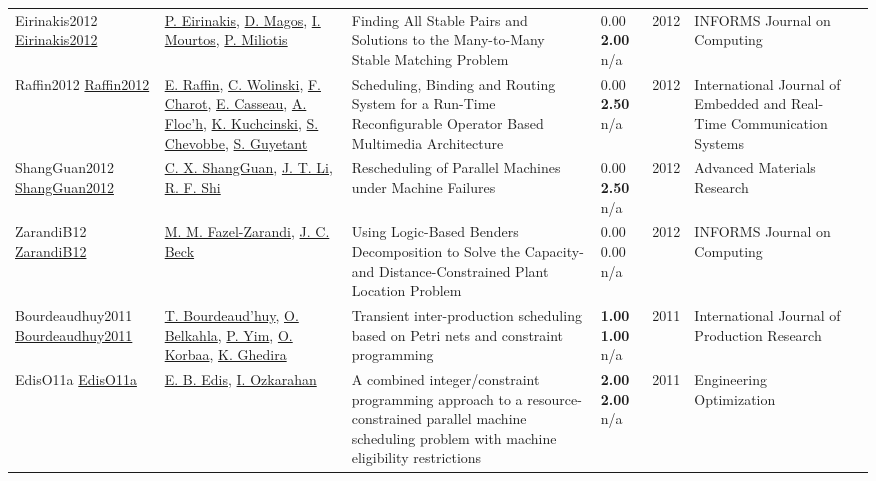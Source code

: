 {\begin{longtable}{p{3cm}p{5cm}p{10cm}p{1cm}rp{2.5cm}l}
Eirinakis2012 \href{http://dx.doi.org/10.1287/ijoc.1110.0449}{Eirinakis2012} & \hyperref[auth:a1913]{P. Eirinakis}, \hyperref[auth:a1914]{D. Magos}, \hyperref[auth:a1915]{I. Mourtos}, \hyperref[auth:a1916]{P. Miliotis} & Finding All Stable Pairs and Solutions to the Many-to-Many Stable Matching Problem & \noindent{}\textcolor{black!50}{0.00} \textbf{2.00} n/a & 2012 & \cellcolor{red!20}INFORMS Journal on Computing & \cite{Eirinakis2012}\\
Raffin2012 \href{http://dx.doi.org/10.4018/jertcs.2012010101}{Raffin2012} & \hyperref[auth:a1529]{E. Raffin}, \hyperref[auth:a658]{C. Wolinski}, \hyperref[auth:a1530]{F. Charot}, \hyperref[auth:a1531]{E. Casseau}, \hyperref[auth:a1532]{A. Floc’h}, \hyperref[auth:a659]{K. Kuchcinski}, \hyperref[auth:a1533]{S. Chevobbe}, \hyperref[auth:a1534]{S. Guyetant} & \cellcolor{green!10}Scheduling, Binding and Routing System for a Run-Time Reconfigurable Operator Based Multimedia Architecture & \noindent{}\textcolor{black!50}{0.00} \textbf{2.50} n/a & 2012 & International Journal of Embedded and Real-Time Communication Systems & \cite{Raffin2012}\\
ShangGuan2012 \href{http://dx.doi.org/10.4028/www.scientific.net/amr.443-444.724}{ShangGuan2012} & \hyperref[auth:a1980]{C. X. ShangGuan}, \hyperref[auth:a1981]{J. T. Li}, \hyperref[auth:a1982]{R. F. Shi} & Rescheduling of Parallel Machines under Machine Failures & \noindent{}\textcolor{black!50}{0.00} \textbf{2.50} n/a & 2012 & Advanced Materials Research & \cite{ShangGuan2012}\\
ZarandiB12 \href{http://dx.doi.org/10.1287/ijoc.1110.0458}{ZarandiB12} & \hyperref[auth:a944]{M. M. Fazel-Zarandi}, \hyperref[auth:a89]{J. C. Beck} & Using Logic-Based Benders Decomposition to Solve the Capacity- and Distance-Constrained Plant Location Problem & \noindent{}\textcolor{black!50}{0.00} \textcolor{black!50}{0.00} n/a & 2012 & \cellcolor{red!20}INFORMS Journal on Computing & \cite{ZarandiB12}\\
Bourdeaudhuy2011 \href{http://dx.doi.org/10.1080/00207543.2010.519113}{Bourdeaudhuy2011} & \hyperref[auth:a1648]{T. Bourdeaud'huy}, \hyperref[auth:a1649]{O. Belkahla}, \hyperref[auth:a680]{P. Yim}, \hyperref[auth:a679]{O. Korbaa}, \hyperref[auth:a1650]{K. Ghedira} & Transient inter-production scheduling based on Petri nets and constraint programming & \noindent{}\textbf{1.00} \textbf{1.00} n/a & 2011 & \cellcolor{red!20}International Journal of Production Research & \cite{Bourdeaudhuy2011}\\
EdisO11a \href{http://dx.doi.org/10.1080/03052151003759117}{EdisO11a} & \hyperref[auth:a346]{E. B. Edis}, \hyperref[auth:a348]{I. Ozkarahan} & A combined integer/constraint programming approach to a resource-constrained parallel machine scheduling problem with machine eligibility restrictions & \noindent{}\textbf{2.00} \textbf{2.00} n/a & 2011 & \cellcolor{red!20}Engineering Optimization & \cite{EdisO11a}\\

\end{longtable}}
